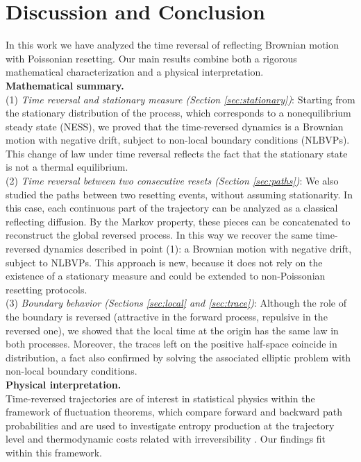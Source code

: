 \documentclass[11pt,a4paper]{article}
\theoremstyle{definition}
\theoremstyle{remark}
\begin{document}
\section{Discussion and Conclusion}
In this work we have analyzed the time reversal of reflecting Brownian motion with Poissonian resetting. Our main results combine both a rigorous mathematical characterization and a physical interpretation.
	\\
	\textbf{Mathematical summary.}\\
	(1) \textit{Time reversal and stationary measure (Section \ref{sec:stationary})}: Starting from the stationary distribution of the process, which corresponds to a nonequilibrium steady state (NESS), we proved that the time-reversed dynamics is a Brownian motion with negative drift, subject to non-local boundary conditions (NLBVPs). This change of law under time reversal reflects the fact that the stationary state is not a thermal equilibrium.\\
	(2) \textit{Time reversal between two consecutive resets (Section \ref{sec:paths})}: We also studied the paths between two resetting events, without assuming stationarity. In this case, each continuous part of the trajectory can be analyzed as a classical reflecting diffusion. By the Markov property, these pieces can be concatenated to reconstruct the global reversed process. In this way we recover the same time-reversed dynamics described in point (1): a Brownian motion with negative drift, subject to NLBVPs. This approach is new, because it does not rely on the existence of a stationary measure and could be extended to non-Poissonian resetting protocols.\\
	(3) \textit{Boundary behavior (Sections \ref{sec:local} and \ref{sec:trace})}: Although the role of the boundary is reversed (attractive in the forward process, repulsive in the reversed one), we showed that the local time at the origin has the same law in both processes. Moreover, the traces left on the positive half-space coincide in distribution, a fact also confirmed by solving the associated elliptic problem with non-local boundary conditions.
	\\
	\textbf{Physical interpretation.}\\
	Time-reversed trajectories are of interest in statistical physics within the framework of fluctuation theorems, which compare forward and backward path probabilities and are used to investigate entropy production at the trajectory level \cite{mori2023entropy} and thermodynamic costs related with irreversibility \cite{olsen2024thermodynamic}. Our findings fit within this framework.
\end{document}
